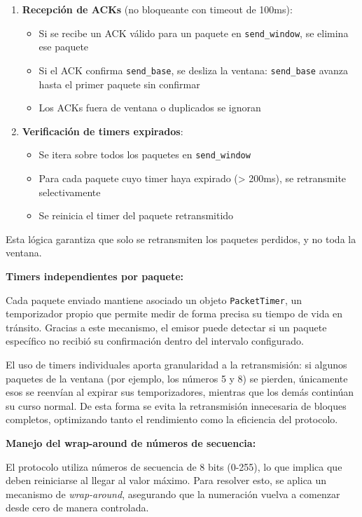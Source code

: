 \begin{enumerate}
    \item \textbf{Recepción de ACKs} (no bloqueante con timeout de 100ms):
    \begin{itemize}
        \item Si se recibe un ACK válido para un paquete en \texttt{send\_window}, se elimina ese paquete
        \item Si el ACK confirma \texttt{send\_base}, se desliza la ventana: \texttt{send\_base} avanza hasta el primer paquete sin confirmar
        \item Los ACKs fuera de ventana o duplicados se ignoran
    \end{itemize}
    
    \item \textbf{Verificación de timers expirados}:
    \begin{itemize}
        \item Se itera sobre todos los paquetes en \texttt{send\_window}
        \item Para cada paquete cuyo timer haya expirado (> 200ms), se retransmite selectivamente
        \item Se reinicia el timer del paquete retransmitido
    \end{itemize}
\end{enumerate}

Esta lógica garantiza que solo se retransmiten los paquetes perdidos, y no toda la ventana.

\textbf{Timers independientes por paquete:}

Cada paquete enviado mantiene asociado un objeto \texttt{PacketTimer}, un temporizador propio que permite medir de forma precisa su tiempo de vida en tránsito. Gracias a este mecanismo, el emisor puede detectar si un paquete específico no recibió su confirmación dentro del intervalo configurado. 

El uso de timers individuales aporta granularidad a la retransmisión: si algunos paquetes de la ventana (por ejemplo, los números 5 y 8) se pierden, únicamente esos se reenvían al expirar sus temporizadores, mientras que los demás continúan su curso normal. De esta forma se evita la retransmisión innecesaria de bloques completos, optimizando tanto el rendimiento como la eficiencia del protocolo.

\textbf{Manejo del wrap-around de números de secuencia:}

El protocolo utiliza números de secuencia de 8 bits (0-255), lo que implica que deben reiniciarse al llegar al valor máximo. Para resolver esto, se aplica un mecanismo de \textit{wrap-around}, asegurando que la numeración vuelva a comenzar desde cero de manera controlada. 

